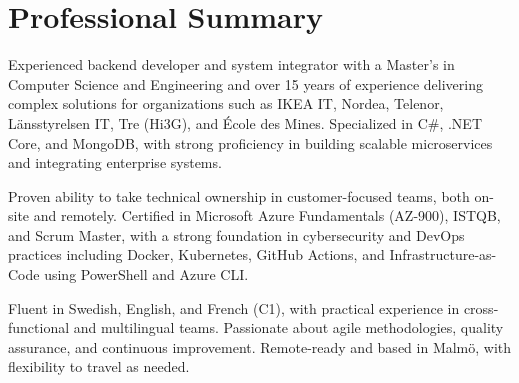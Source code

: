 \section*{Professional Summary}
Experienced backend developer and system integrator with a Master’s in Computer Science and Engineering and over 15 years of experience delivering complex solutions for organizations such as IKEA IT, Nordea, Telenor, Länsstyrelsen IT, Tre (Hi3G), and École des Mines. Specialized in C\#, .NET Core, and MongoDB, with strong proficiency in building scalable microservices and integrating enterprise systems.

Proven ability to take technical ownership in customer-focused teams, both on-site and remotely. Certified in Microsoft Azure Fundamentals (AZ-900), ISTQB, and Scrum Master, with a strong foundation in cybersecurity and DevOps practices including Docker, Kubernetes, GitHub Actions, and Infrastructure-as-Code using PowerShell and Azure CLI.

Fluent in Swedish, English, and French (C1), with practical experience in cross-functional and multilingual teams. Passionate about agile methodologies, quality assurance, and continuous improvement. Remote-ready and based in Malmö, with flexibility to travel as needed.
